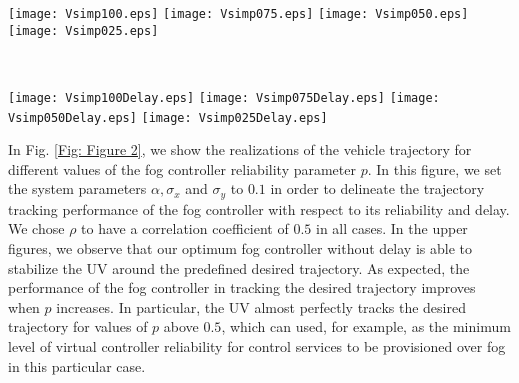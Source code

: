 \documentclass[10pt, journal, letterpaper]{IEEEtran}
\newcommand{\1}{\ensuremath{\mathbf{1}}} %
\begin{document}
\begin{figure*}[!t]
\begin{minipage}[t]{20cm}
\begin{center}
\hspace{-1.75cm}
\texttt{[image: Vsimp100.eps]}
%
\hspace{-0.5cm}
%
\texttt{[image: Vsimp075.eps]}
%
\hspace{-0.5cm}
%
\texttt{[image: Vsimp050.eps]}
%
\hspace{-0.5cm}
%
\texttt{[image: Vsimp025.eps]}
\end{center}
\end{minipage}
%
\\
%
\begin{minipage}[t]{20cm}
\begin{center}
\hspace{-1.75cm}
\texttt{[image: Vsimp100Delay.eps]}
%
\hspace{-0.5cm}
%
\texttt{[image: Vsimp075Delay.eps]}
%
\hspace{-0.5cm}
%
\texttt{[image: Vsimp050Delay.eps]}
%
\hspace{-0.5cm}
%
\texttt{[image: Vsimp025Delay.eps]}
\end{center}
\end{minipage}
\caption{Effect of reliability on the trajectory tracking performance of a UV fog controller. ($\alpha = 0.1, \sigma_x = 0.1$, $\sigma_v = 0.1$ and $\rho = \frac{\sigma_x \sigma_v}{2}$ for all figures.  The upper figures are for the case without delay, whereas the lower figures are for the case with delay $M = 3 \Delta t$.)}  \label{Fig: Figure 2}
\end{figure*}

In Fig. \ref{Fig: Figure 2}, we show the realizations of the vehicle trajectory for different values of the fog controller reliability parameter $p$.  In this figure, we set the system parameters $\alpha, \sigma_x$ and $\sigma_y$ to $0.1$ in order to delineate the trajectory tracking performance of the fog controller with respect to its reliability and delay.  We chose $\rho$ to have a correlation coefficient of $0.5$ in all cases.  In the upper figures, we observe that our optimum fog controller without delay is able to stabilize the UV around the predefined desired trajectory.  As expected, the performance of the fog controller in tracking the desired trajectory improves when $p$ increases. In particular, the UV almost perfectly tracks the desired trajectory for values of $p$ above $0.5$, which can used, for example, as the minimum level of virtual controller reliability for control services to be provisioned over fog in this particular case.
\end{document}
